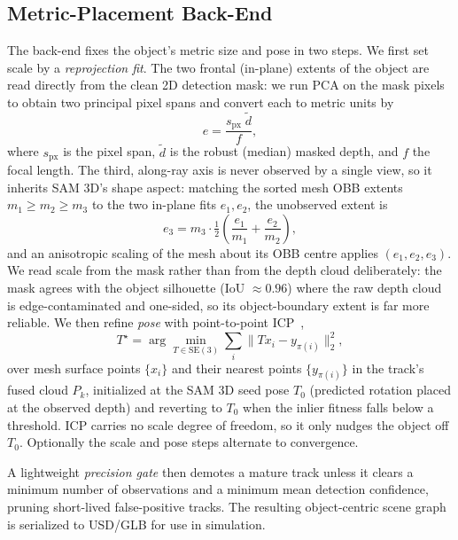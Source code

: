 \documentclass[conference]{IEEEtran}
\begin{document}
\subsection{Metric-Placement Back-End}
\label{sec:backend}
The back-end fixes the object's metric size and pose in two steps. We first set
scale by a \emph{reprojection fit}. The two frontal (in-plane) extents of the
object are read directly from the clean 2D detection mask: we run PCA on the
mask pixels to obtain two principal pixel spans and convert each to metric units
by
\begin{equation}
  e = \frac{s_{\text{px}}\; \tilde{d}}{f},
  \label{eq:reproj}
\end{equation}
where $s_{\text{px}}$ is the pixel span, $\tilde{d}$ is the robust (median)
masked depth, and $f$ the focal length. The third, along-ray axis is never
observed by a single view, so it inherits SAM 3D's shape aspect: matching the
sorted mesh OBB extents $m_1\!\ge\!m_2\!\ge\!m_3$ to the two in-plane fits
$e_1,e_2$, the unobserved extent is
\begin{equation}
  e_3 = m_3\cdot\tfrac{1}{2}\!\left(\frac{e_1}{m_1}+\frac{e_2}{m_2}\right),
  \label{eq:third}
\end{equation}
and an anisotropic scaling of the mesh about its OBB centre applies
$(e_1,e_2,e_3)$. We read scale from the mask
rather than from the depth cloud deliberately: the mask agrees with the object
silhouette (IoU $\approx 0.96$) where the raw depth cloud is edge-contaminated
and one-sided, so its object-boundary extent is far more reliable. We then
refine \emph{pose} with point-to-point ICP~\cite{icp},
\begin{equation}
  T^\star=\arg\min_{T\in\mathrm{SE}(3)}\sum_i \big\lVert T x_i - y_{\pi(i)}\big\rVert_2^2,
  \label{eq:icp}
\end{equation}
over mesh surface points $\{x_i\}$ and their nearest points $\{y_{\pi(i)}\}$ in
the track's fused cloud $P_k$, initialized at the SAM 3D seed pose $T_0$
(predicted rotation placed at the observed depth) and reverting to $T_0$ when
the inlier fitness falls below a threshold. ICP carries no scale degree of
freedom, so it only nudges the object off $T_0$. Optionally the scale and pose
steps alternate to convergence.

A lightweight \emph{precision gate} then demotes a mature track unless it clears
a minimum number of observations and a minimum mean detection confidence,
pruning short-lived false-positive tracks. The resulting object-centric scene
graph is serialized to USD/GLB for use in simulation.
\end{document}
